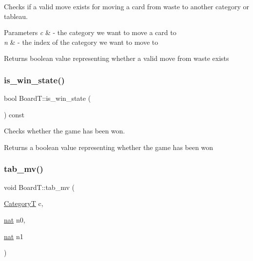Checks if a valid move exists for moving a card from waste to another category or tableau. 


\begin{DoxyParams}{Parameters}
{\em c} & -\/ the category we want to move a card to \\
\hline
{\em n} & -\/ the index of the category we want to move to \\
\hline
\end{DoxyParams}
\begin{DoxyReturn}{Returns}
boolean value representing whether a valid move from waste exists 
\end{DoxyReturn}
\mbox{\label{class_board_t_acd9b901204dafd4c4c1950530781ab12}} 
\subsubsection{\texorpdfstring{is\+\_\+win\+\_\+state()}{is\_win\_state()}}
{\footnotesize\ttfamily bool Board\+T\+::is\+\_\+win\+\_\+state (\begin{DoxyParamCaption}{ }\end{DoxyParamCaption}) const}



Checks whether the game has been won. 

\begin{DoxyReturn}{Returns}
a boolean value representing whether the game has been won 
\end{DoxyReturn}
\mbox{\label{class_board_t_a812f5c08de1db6cc2f2e102d2cf64980}} 
\subsubsection{\texorpdfstring{tab\+\_\+mv()}{tab\_mv()}}
{\footnotesize\ttfamily void Board\+T\+::tab\+\_\+mv (\begin{DoxyParamCaption}\item[{\hyperlink{_card_types_8h_aa77f81f8d4c8aa57046a50ca32d6b7b4}{CategoryT}}]{c,  }\item[{\hyperlink{_card_types_8h_a56638ee9d162e8cce3a15f92d2023d6e}{nat}}]{n0,  }\item[{\hyperlink{_card_types_8h_a56638ee9d162e8cce3a15f92d2023d6e}{nat}}]{n1 }\end{DoxyParamCaption})}




